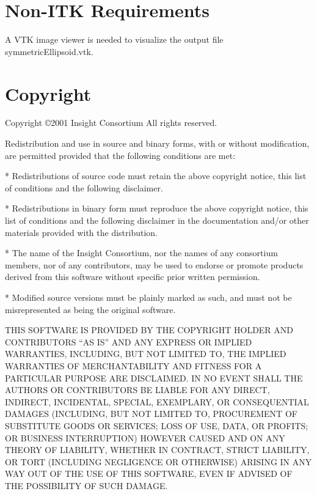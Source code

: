 \documentclass{InsightHowto}
\begin{document}
\section{Non-ITK Requirements}
A VTK image viewer is needed to visualize the output file symmetricEllipsoid.vtk.

\section{Copyright}
Copyright \copyright 2001 Insight Consortium All rights reserved.

Redistribution and use in source and binary forms, with or without modification, are
permitted provided that the following conditions are met:

 * Redistributions of source code must retain the above copyright notice,
   this list of conditions and the following disclaimer.

 * Redistributions in binary form must reproduce the above copyright notice,
   this list of conditions and the following disclaimer in the documentation
   and/or other materials provided with the distribution.

 * The name of the Insight Consortium, nor the names of any consortium members,
   nor of any contributors, may be used to endorse or promote products derived
   from this software without specific prior written permission.

  * Modified source versions must be plainly marked as such, and must not be
    misrepresented as being the original software.

THIS SOFTWARE IS PROVIDED BY THE COPYRIGHT HOLDER AND CONTRIBUTORS ``AS IS'' AND ANY EXPRESS
OR IMPLIED WARRANTIES, INCLUDING, BUT NOT LIMITED TO, THE IMPLIED WARRANTIES OF
MERCHANTABILITY AND FITNESS FOR A PARTICULAR PURPOSE ARE DISCLAIMED. IN NO EVENT SHALL THE
AUTHORS OR CONTRIBUTORS BE LIABLE FOR ANY DIRECT, INDIRECT, INCIDENTAL, SPECIAL, EXEMPLARY,
OR CONSEQUENTIAL DAMAGES (INCLUDING, BUT NOT LIMITED TO, PROCUREMENT OF SUBSTITUTE GOODS OR
SERVICES; LOSS OF USE, DATA, OR PROFITS; OR BUSINESS INTERRUPTION) HOWEVER CAUSED AND ON ANY
THEORY OF LIABILITY, WHETHER IN CONTRACT, STRICT LIABILITY, OR TORT (INCLUDING NEGLIGENCE OR
OTHERWISE) ARISING IN ANY WAY OUT OF THE USE OF THIS SOFTWARE, EVEN IF ADVISED OF THE
POSSIBILITY OF SUCH DAMAGE.
\end{document}
